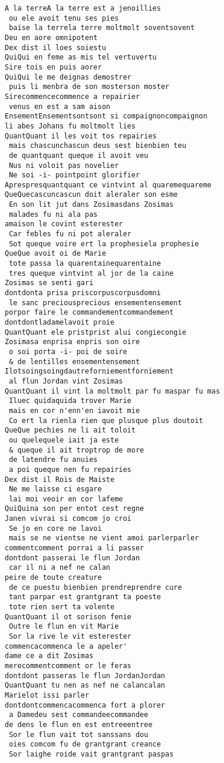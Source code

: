 \documentclass[
  letterpaper,
  DIV=11,
  numbers=noendperiod]{scrreprt}
\begin{document}
\begin{verbatim}
A la terreA la terre est a jenoillies
 ou ele avoit tenu ses pies
 baise la terrela terre moltmolt soventsovent
Deu en aore omnipotent
Dex dist il loes soiestu
QuiQui en feme as mis tel vertuvertu
Sire tois en puis aorer
QuiQui le me deignas demostrer
 puis li menbra de son mosterson moster
Sirecommencecommence a repairier
 venus en est a sam aison
EnsementEnsementsontsont si compaignoncompaignon
li abes Johans fu moltmolt lies
QuantQuant il les voit tos repairies
 mais chascunchascun deus sest bienbien teu
 de quantquant queque il avoit veu
 Nus ni voloit pas novelier
 Ne soi -i- pointpoint glorifier
Aprespresquantquant ce vintvint al quaremequareme
QueQuecascuncascun doit aleraler son esme
 En son lit jut dans Zosimasdans Zosimas
 malades fu ni ala pas
amaison le covint esterester
 Car febles fu ni pot aleraler
 Sot queque voire ert la prophesiela prophesie
QueQue avoit oi de Marie
 tote passa la quarentainequarentaine
 tres queque vintvint al jor de la caine
Zosimas se senti gari
dontdonta prisa priscorpuscorpusdomni
 le sanc preciousprecious ensementensement
porpor faire le commandementcommandement
dontdontladamelavoit proie
QuantQuant ele pristprist alui congiecongie
Zosimasa enprisa enpris son oire
 o soi porta -i- poi de soire
 & de lentilles ensementensement
Ilotsoingsoingdautreforniementforniement
 al flun Jordan vint Zosimas
QuantQuant il vint la moltmolt par fu maspar fu mas
 Iluec quidaquida trover Marie
 mais en cor n'enn'en iavoit mie
 Co ert la rienla rien que plusque plus doutoit
QueQue pechies ne li ait toloit
 ou quelequele iait ja este
 & queque il ait troptrop de more
 de latendre fu anuies
 a poi queque nen fu repairies
Dex dist il Rois de Maiste
 Ne me laisse ci esgare
 lai moi veoir en cor lafeme
QuiQuina son per entot cest regne
Janen vivrai si comcom jo croi
 Se jo en core ne lavoi
 mais se ne vientse ne vient amoi parlerparler
commentcomment porrai a li passer
dontdont passerai le flun Jordan
 car il ni a nef ne calan
peire de toute creature
 de ce puestu bienbien prendreprendre cure
 tant parpar est grantgrant ta poeste
 tote rien sert ta volente
QuantQuant il ot sorison fenie
 Outre le flun en vit Marie
 Sor la rive le vit esterester
commencacommenca le a apeler'
dame ce a dit Zosimas
merecommentcomment or le feras
dontdont passeras le flun JordanJordan
QuantQuant tu nen as nef ne calancalan
Marielot issi parler
dontdontcommencacommenca fort a plorer
 a Damedeu sest commandeecommandee
de dens le flun en est entreeentree
 Sor le flun vait tot sanssans dou
 oies comcom fu de grantgrant creance
 Sor laighe roide vait grantgrant paspas

\end{verbatim}
\end{document}
